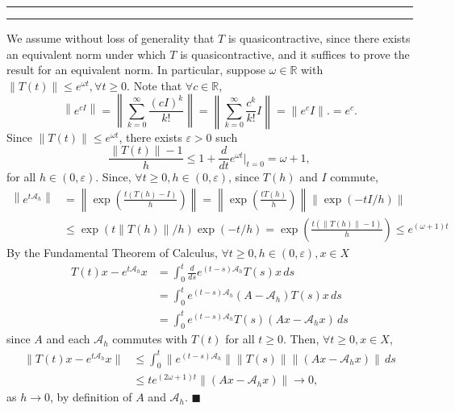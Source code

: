 \documentclass[11pt]{article}
\newcounter{questionCounter}
\newcounter{partCounter}[questionCounter]
\newenvironment{question}[2][\arabic{questionCounter}]{%
    \setcounter{partCounter}{0}%
    \vspace{.25in} \hrule \vspace{0.5em}%
        \noindent{\bf #2}%
    \vspace{0.8em} \hrule \vspace{.10in}%
    \addtocounter{questionCounter}{1}%
}{}
\renewcommand{\qed}{\quad \ensuremath{\blacksquare}}
\newcommand{\R}{\mathbb{R}}             %
\newcommand{\e}{\varepsilon}            %
\newcommand{\A}{\mathcal{A}}            %
\begin{document}
\vspace{-8mm}
\begin{question}{Problem 3}
We assume without loss of generality that $T$ is quasicontractive, since there
exists an equivalent norm under which $T$ is quasicontractive, and it suffices
to prove the result for an equivalent norm. In particular, suppose
$\omega \in \R$ with $\|T(t)\| \leq e^{\omega t}, \forall t \geq 0$.
Note that $\forall c \in \R$,
\[\left\| e^{cI} \right\|
    = \left\| \sum_{k = 0}^\infty \frac{(cI)^k}{k!} \right\|
    = \left\| \sum_{k = 0}^\infty \frac{c^k}{k!} I\right\|
    = \|e^cI\|.
    = e^c.
\]
Since $\|T(t)\| \leq e^{\omega t}$, there exists $\e > 0$ such
\[\frac{\|T(t)\| - 1}{h}
    \leq 1 + \frac{d}{dt} e^{\omega t} \bigg|_{t = 0}
    = \omega + 1,
\]
for all $h \in (0,\e)$. Since, $\forall t \geq 0, h \in (0,\e)$, since $T(h)$
and $I$ commute,
\begin{align*}
\left\| e^{t\A_h} \right\|
&   = \left\| \exp \left( \frac{t(T(h) - I)}{h} \right) \right\|
    = \left\| \exp \left( \frac{tT(h)}{h} \right) \right\|
                                \left\| \exp \left( -tI/h \right) \right\| \\
&   \leq \exp \left( t\|T(h)\|/h \right) \exp \left( -t/h \right)
    = \exp \left( \frac{t(\|T(h)\| - 1)}{h} \right)
    \leq e^{(\omega + 1) t}
\end{align*}
By the Fundamental Theorem of Calculus, $\forall t \geq 0, h \in (0,\e),
x \in X$
\begin{align*}
T(t) x - e^{t\A_h} x
 &  = \int_0^t \frac{d}{ds} e^{(t - s)\A_h} T(s) x \, ds    \\
 &  = \int_0^t e^{(t - s)\A_h} (A - \A_h) T(s) x \, ds      \\
 &  = \int_0^t e^{(t - s)\A_h} T(s) (Ax - \A_hx) \, ds
\end{align*}
since $A$ and each $\A_h$ commutes with $T(t)$ for all $t \geq 0$. Then,
$\forall t \geq 0, x \in X$,
\begin{align*}
\|T(t) x - e^{t\A_h} x\|
 &  \leq \int_0^t \|e^{(t - s)\A_h}\| \|T(s)\| \|(Ax - \A_hx)\| \, ds   \\
 &  \leq te^{(2\omega + 1)t} \|(Ax - \A_hx)\| \to 0,
\end{align*}
as $h \to 0$, by definition of $A$ and $\A_h$. \qed
\end{question}
\end{document}
